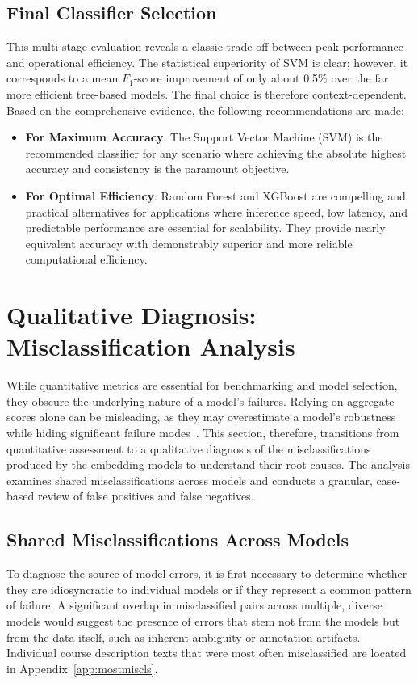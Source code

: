 \subsection{Final Classifier Selection}\label{ch:4.5.4}
This multi-stage evaluation reveals a classic trade-off between peak performance and operational efficiency. The statistical superiority of SVM is clear; however, it corresponds to a mean \(F_1\)-score improvement of only about 0.5\% over the far more efficient tree-based models. The final choice is therefore context-dependent. Based on the comprehensive evidence, the following recommendations are made:
\begin{itemize}
    \item \textbf{For Maximum Accuracy}: The Support Vector Machine (SVM) is the recommended classifier for any scenario where achieving the absolute highest accuracy and consistency is the paramount objective.
    \item \textbf{For Optimal Efficiency}: Random Forest and XGBoost are compelling and practical alternatives for applications where inference speed, low latency, and predictable performance are essential for scalability. They provide nearly equivalent accuracy with demonstrably superior and more reliable computational efficiency.
\end{itemize}

\section{Qualitative Diagnosis: Misclassification Analysis}\label{ch:4.6}
While quantitative metrics are essential for benchmarking and model selection, they obscure the underlying nature of a model's failures. Relying on aggregate scores alone can be misleading, as they may overestimate a model's robustness while hiding significant failure modes~\cite{gauthier2022}. This section, therefore, transitions from quantitative assessment to a qualitative diagnosis of the misclassifications produced by the embedding models to understand their root causes. The analysis examines shared misclassifications across models and conducts a granular, case-based review of false positives and false negatives.

\subsection{Shared Misclassifications Across Models}\label{ch:4.6.1}
To diagnose the source of model errors, it is first necessary to determine whether they are idiosyncratic to individual models or if they represent a common pattern of failure. A significant overlap in misclassified pairs across multiple, diverse models would suggest the presence of errors that stem not from the models but from the data itself, such as inherent ambiguity or annotation artifacts.  Individual course description texts that were most often misclassified are located in Appendix~\ref{app:mostmiscls}.

